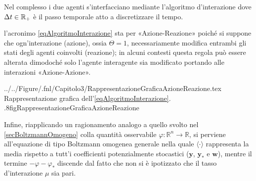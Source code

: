                 Nel complesso i due agenti s'interfacciano mediante l'algoritmo d'interazione
                dove \(\Delta t\in\mathbb R_+\) è il passo temporale atto a discretizzare il tempo.

                \begin{oss}
                    \label{ossAlgoritmoAzioneReazione}
                    l'acronimo \ref{eqAlgoritmoInterazione} sta per «Azione-Reazione» poiché si suppone che ogn'interazione (azione), ossia \(\Theta=1\), necessariamente modifica entrambi gli stati degli agenti coinvolti (reazione); in alcuni contesti \cite{Nurisso2024} questa regola può essere alterata dimodoché solo l'agente interagente sia modificato portando alle interazioni «Azione-Azione».
                \end{oss}

                    {../../Figure/.fnl/Capitolo3/RappresentazioneGraficaAzioneReazione.tex}
                    {Rappresentazione grafica dell'\ref{eqAlgoritmoInterazione}.}
                    {.8\linewidth}{figRappresentazioneGraficaAzioneReazione}

                Infine, riapplicando un ragionamento analogo a quello svolto nel \cref{secBoltzmannOmogeno} colla quantità osservabile \(\varphi\colon\mathbb R^n\to\mathbb R\), si perviene all'equazione di tipo Boltzmann omogenea generale
                nella quale \(\langle\cdot\rangle\) rappresenta la media rispetto a tutt'i coefficienti potenzialmente stocastici (\(\mathbf y\), \(\mathbf y_*\) e \(\mathbf w\)), mentre il termine \(-\varphi-\varphi_*\) discende dal fatto che non si è ipotizzato che il tasso d'interazione \(\mu\) sia pari.
                
